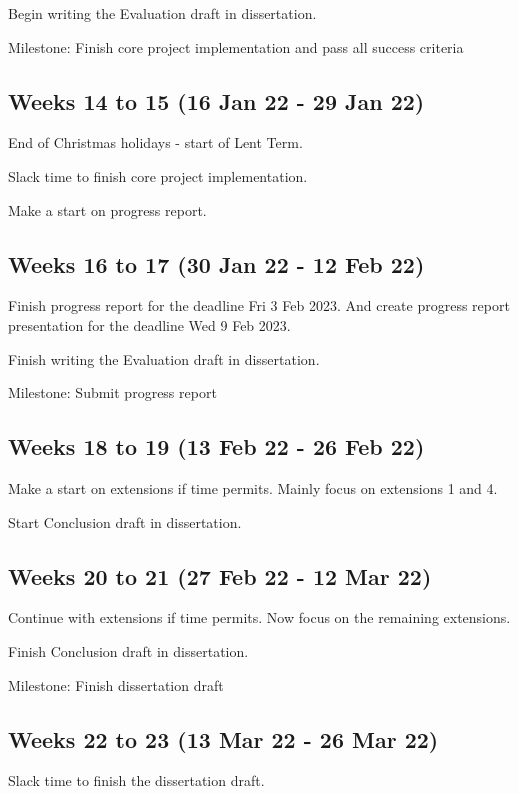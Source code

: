 \documentclass[12pt,a4paper,twoside]{article}
\begin{document}
Begin writing the Evaluation draft in dissertation.

Milestone: Finish core project implementation and pass all success criteria  

\subsection*{Weeks 14 to 15 (16 Jan 22 - 29 Jan 22)}
End of Christmas holidays - start of Lent Term.

Slack time to finish core project implementation.

Make a start on progress report.

\subsection*{Weeks 16 to 17 (30 Jan 22 - 12 Feb 22)}

Finish progress report for the deadline Fri 3 Feb 2023. And create progress report presentation for the deadline Wed 9 Feb 2023.

Finish writing the Evaluation draft in dissertation.

Milestone: Submit progress report 

\subsection*{Weeks 18 to 19 (13 Feb 22 - 26 Feb 22)}

Make a start on extensions if time permits. Mainly focus on extensions 1 and 4.

Start Conclusion draft in dissertation.

\subsection*{Weeks 20 to 21 (27 Feb 22 - 12 Mar 22)}

Continue with extensions if time permits. Now focus on the remaining extensions.

Finish Conclusion draft in dissertation.

Milestone: Finish dissertation draft

\subsection*{Weeks 22 to 23 (13 Mar 22 - 26 Mar 22)}

Slack time to finish the dissertation draft.
\end{document}
